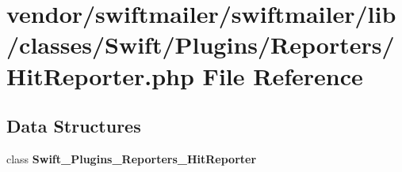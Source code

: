 \section{vendor/swiftmailer/swiftmailer/lib/classes/\+Swift/\+Plugins/\+Reporters/\+Hit\+Reporter.php File Reference}
\label{_hit_reporter_8php}
\subsection*{Data Structures}
\begin{DoxyCompactItemize}
\item 
class {\bf Swift\+\_\+\+Plugins\+\_\+\+Reporters\+\_\+\+Hit\+Reporter}
\end{DoxyCompactItemize}
